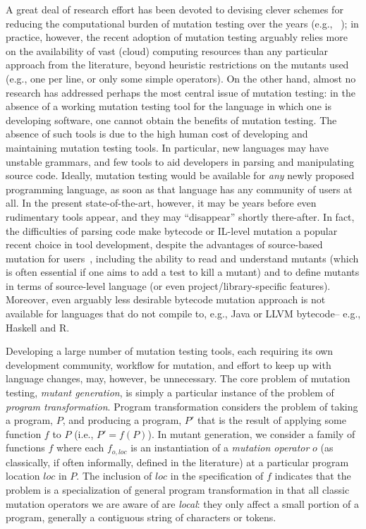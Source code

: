 \documentclass[acmsmall]{acmart}
\begin{document}
A great deal of research effort has been devoted to devising clever
schemes for reducing the computational burden of mutation testing over
the years (e.g., ~\cite{offutt2001mutation,
  untch1993mutation,KaufmanFAKAJ2022}); in practice, however, the recent adoption of mutation
testing arguably relies more on the availability of vast (cloud) computing
resources than any particular approach from the literature, beyond
heuristic restrictions on the mutants used (e.g., one per line, or
only some simple operators).   On the other hand, almost no
research has addressed perhaps the most central issue of
mutation testing: in the absence of a working mutation testing
tool for the language in which one is developing software, one cannot
obtain the benefits of mutation testing.  The absence of such tools is
due to the high human cost of developing and maintaining mutation
testing tools.  In particular, new languages may have unstable
grammars, and few tools to aid developers in parsing and manipulating
source code.   Ideally, mutation testing would be available for
\emph{any} newly proposed programming language, as soon as that
language has any community of users at all.  In the present
state-of-the-art, however, it may be years before even rudimentary
tools appear, and they may ``disappear'' shortly there-after.  In
fact, the difficulties of parsing code make bytecode or IL-level
mutation a popular recent choice in tool development, despite the advantages of source-based mutation for
users~\cite{CompareSrcBinary}, including the
ability to read and understand mutants (which is often essential if
one aims to add a test to kill a mutant) and to define mutants in
terms of source-level language (or even project/library-specific
features).  Moreover, even arguably less desirable bytecode mutation
approach is not available for languages that do not compile to, e.g.,
Java or LLVM bytecode-- e.g., Haskell and R.

Developing a large number of mutation
testing tools, each requiring its own development community, workflow
for mutation, and effort to keep up with language changes, may, however, be
unnecessary.  The core problem of mutation testing,
\emph{mutant generation}, is simply a particular instance of the
problem of \emph{program transformation}.  Program transformation
considers the problem of taking a program, $P$, and producing a
program, $P'$ that is the result of applying some function $f$ to $P$
(i.e., $P' = f(P)$).  In mutant generation, we
consider a family of functions $f$ where each $f_{o,loc}$ is an
instantiation of a \emph{mutation operator} $o$  (as classically, if
often informally, defined in the literature) at a particular program
location $loc$ in $P$.  The inclusion of $loc$ in the specification of
$f$ indicates that the problem is a specialization of general
program transformation in that all classic mutation operators we are
aware of are \emph{local}: they only affect a small portion of a
program, generally a contiguous string of characters or tokens.
\end{document}
